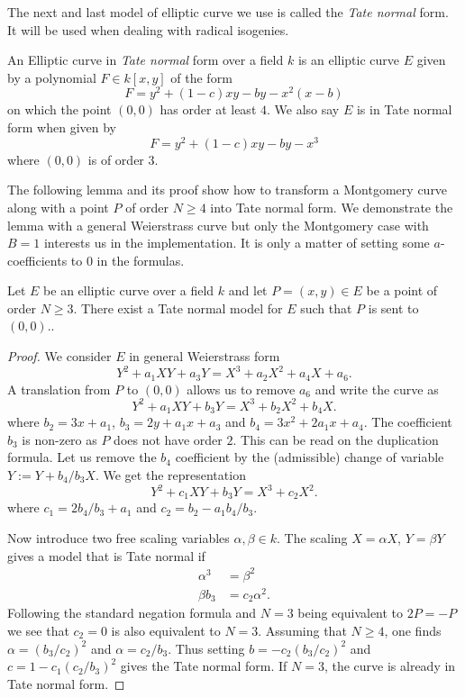 \documentclass[../main/main.tex]{subfiles}
\begin{document}
The next and last model of elliptic curve we use is called the \textit{Tate normal} form.
It will be used when dealing with radical isogenies.
\begin{definition}
	An Elliptic curve in \textit{Tate normal} form over a field $k$ is an elliptic curve $E$ given by a polynomial $F\in k[x, y]$ of the form
	\[
		F = y^2 + (1-c)xy - by - x^2(x-b)
	\]
	on which the point $(0,0)$ has order at least $4$.
	We also say $E$ is in Tate normal form when given by
	\[
		F = y^2 + (1-c)xy - by - x^3
	\]
	where $(0,0)$ is of order $3$.
\end{definition}
The following lemma and its proof show how to transform a Montgomery curve along with a point $P$ of order $N\geq 4$ into Tate normal form.
We demonstrate the lemma with a general Weierstrass curve but only the Montgomery case with $B=1$ interests us in the implementation.
It is only a matter of setting some $a$-coefficients to $0$ in the formulas.
\begin{lemma}
	Let $E$ be an elliptic curve over a field $k$ and let $P=(x, y)\in E$ be a point of order $N\geq 3$.
	There exist a Tate normal model for $E$ such that $P$ is sent to $(0,0)$..
\end{lemma}
\begin{proof}
	We consider $E$ in general Weierstrass form
	\[
		Y^2 + a_1XY + a_3Y = X^3 +a_2 X^2 + a_4 X + a_6.
	\]
	A translation from $P$ to $(0, 0)$ allows us to remove $a_6$ and write the curve as
	\[
		Y^2 + a_1XY + b_3Y = X^3 +b_2 X^2 + b_4 X.
	\]
	where $b_2 = 3x+a_1$, $b_3 = 2y + a_1x + a_3$ and $b_4 = 3x^2 +2a_1x+a_4$.
	The coefficient $b_3$ is non-zero as $P$ does not have order $2$.
	This can be read on the duplication formula.
	Let us remove the $b_4$ coefficient by the (admissible) change of variable $Y :=Y + b_4 /b_3  X$.
	We get the representation
	\[
		Y^2 + c_1XY + b_3Y = X^3 +c_2 X^2.
	\]
	where  $c_1 = 2 b_4 / b_3 + a_1$ and $c_2 = b_2 - a_1b_4/b_3$.

	Now introduce two free scaling variables $\alpha, \beta\in k$.
	The scaling $X = \alpha X$, $Y = \beta Y$ gives a model that is Tate normal if
	\begin{align*}
		{\alpha}^3 &= 	{\beta}^2 \\
		\beta b_3 &= c_2 {\alpha}^2.
	\end{align*}
	Following the standard negation formula and $N=3$ being equivalent to $2P = -P$ we see that $c_2 = 0$ is also equivalent to $N=3$.
	Assuming that $N\geq 4$, one finds $\alpha = ({b_3}/c_2)^2$ and $\alpha = c_2/b_3$.
	Thus setting $b = -c_2(b_3/c_2)^2$ and $c = 1-c_1(c_2/b_3)^2$ gives the Tate normal form.
	If  $N=3$, the curve is already in Tate normal form.
\end{proof}
\end{document}
